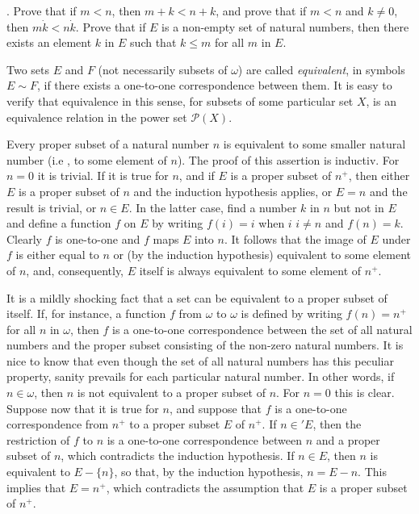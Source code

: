 \begin{named}[Exercise]. Prove that if $m < n$, then $m + k < n + k$, and prove that if $m < n$ and $k \neq 0$, then $m \dot k <n \dot k$. Prove that if $E$ is a non-empty set of natural numbers, then there exists an element $k$ in $E$ such that $k \le m$ for all $m$ in $E$. 
\end{named}

Two sets $E$ and $F$ (not necessarily subsets of $\omega$) are called \textit{equivalent}, in symbols $E \sim F$, if there exists a one-to-one correspondence between them. It is easy to verify that equivalence in this sense, for subsets of some particular set $X$, is an equivalence relation in the power set $\mathcal{P}(X)$.

Every proper subset of a natural number $n$ is equivalent to some smaller natural number (i.e , to some element of $n$). The proof of this assertion is inductiv. For $n = 0$ it is trivial. If it is true for $n$, and if $E$ is a proper subset of $n^{+}$, then either $E$ is a proper subset of $n$ and the induction hypothesis applies, or $E = n$ and the result is trivial, or $n \in E$. In the latter case, find a number $k$ in $n$ but not in $E$ and define a function $f$ on $E$ by writing $f(i) = i$ when $i$ $i \neq n$ and $f(n) = k$. Clearly $f$ is one-to-one and $f$ maps $E$ into $n$. It follows that the image of $E$ under $f$ is either equal to $n$ or (by the induction hypothesis) equivalent to some element of $n$, and, consequently, $E$ itself is always equivalent to some element of $n^{+}$. 

It is a mildly shocking fact that a set can be equivalent to a proper subset of itself. If, for instance, a function $f$ from $\omega$ to $\omega$ is defined by writing $f(n) = n^{+}$ for all $n$ in $\omega$, then $f$ is a one-to-one correspondence between the set of all natural numbers and the proper subset consisting of the non-zero natural numbers. It is nice to know that even though the set of all natural numbers has this peculiar property, sanity prevails for each particular natural number. In other words, if $n \in \omega$, then $n$ is not equivalent to a proper subset of $n$. For $n = 0$ this is clear. Suppose now that it is true for $n$, and suppose that $f$ is a one-to-one correspondence from $n^{+}$ to a proper subset $E$ of $n^{+}$. If $n \in ' E$, then the restriction of $f$ to $n$ is a one-to-one correspondence between $n$ and a proper subset of $n$, which contradicts the induction hypothesis. If $n \in E$, then $n$ is equivalent to $E - \{ n \}$, so that, by the induction hypothesis, $n = E - {n}$. This implies that $E = n^{+}$, which contradicts the assumption that $E$ is a proper subset of $n^{+}$. 

